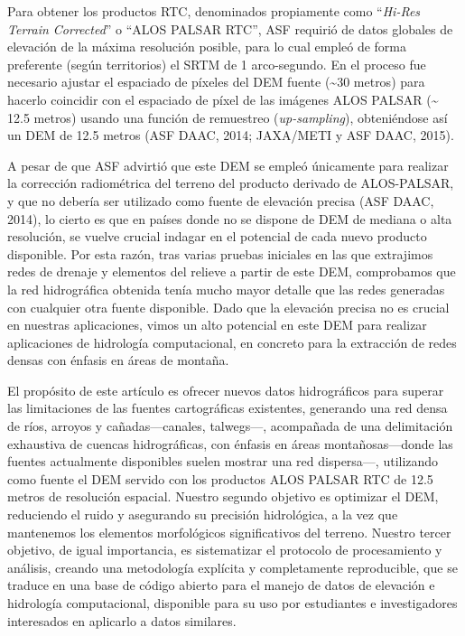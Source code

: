 \documentclass[spanish]{article}
\begin{document}
Para obtener los productos RTC, denominados propiamente como
``\emph{Hi-Res Terrain Corrected}'' o ``ALOS PALSAR RTC'', ASF requirió
de datos globales de elevación de la máxima resolución posible, para lo
cual empleó de forma preferente (según territorios) el SRTM de 1
arco-segundo. En el proceso fue necesario ajustar el espaciado de
píxeles del DEM fuente (\textasciitilde30 metros) para hacerlo coincidir
con el espaciado de píxel de las imágenes ALOS PALSAR (\textasciitilde{}
12.5 metros) usando una función de remuestreo (\emph{up-sampling}),
obteniéndose así un DEM de 12.5 metros (ASF DAAC, 2014; JAXA/METI y ASF
DAAC, 2015).

A pesar de que ASF advirtió que este DEM se empleó únicamente para
realizar la corrección radiométrica del terreno del producto derivado de
ALOS-PALSAR, y que no debería ser utilizado como fuente de elevación
precisa (ASF DAAC, 2014), lo cierto es que en países donde no se dispone
de DEM de mediana o alta resolución, se vuelve crucial indagar en el
potencial de cada nuevo producto disponible. Por esta razón, tras varias
pruebas iniciales en las que extrajimos redes de drenaje y elementos del
relieve a partir de este DEM, comprobamos que la red hidrográfica
obtenida tenía mucho mayor detalle que las redes generadas con cualquier
otra fuente disponible. Dado que la elevación precisa no es crucial en
nuestras aplicaciones, vimos un alto potencial en este DEM para realizar
aplicaciones de hidrología computacional, en concreto para la extracción
de redes densas con énfasis en áreas de montaña.

El propósito de este artículo es ofrecer nuevos datos hidrográficos para
superar las limitaciones de las fuentes cartográficas existentes,
generando una red densa de ríos, arroyos y cañadas---canales,
talwegs---, acompañada de una delimitación exhaustiva de cuencas
hidrográficas, con énfasis en áreas montañosas---donde las fuentes
actualmente disponibles suelen mostrar una red dispersa---, utilizando
como fuente el DEM servido con los productos ALOS PALSAR RTC de 12.5
metros de resolución espacial. Nuestro segundo objetivo es optimizar el
DEM, reduciendo el ruido y asegurando su precisión hidrológica, a la vez
que mantenemos los elementos morfológicos significativos del terreno.
Nuestro tercer objetivo, de igual importancia, es sistematizar el
protocolo de procesamiento y análisis, creando una metodología explícita
y completamente reproducible, que se traduce en una base de código
abierto para el manejo de datos de elevación e hidrología computacional,
disponible para su uso por estudiantes e investigadores interesados en
aplicarlo a datos similares.
\end{document}

